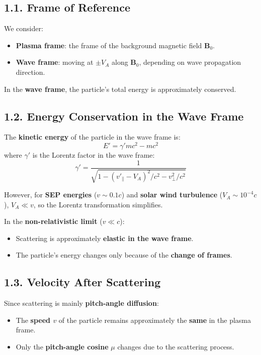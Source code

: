 \subsection*{1.1. \textbf{Frame of Reference}}

We consider:
\begin{itemize}
    \item \textbf{Plasma frame}: the frame of the background magnetic field $\mathbf{B}_0$.
    \item \textbf{Wave frame}: moving at $\pm V_A$ along $\mathbf{B}_0$, depending on wave propagation direction.
\end{itemize}

In the \textbf{wave frame}, the particle’s total energy is approximately conserved.

\subsection*{1.2. \textbf{Energy Conservation in the Wave Frame}}

The \textbf{kinetic energy} of the particle in the wave frame is:
\begin{equation}
E' = \gamma' m c^2 - m c^2
\end{equation}
where $\gamma'$ is the Lorentz factor in the wave frame:
\begin{equation}
\gamma' = \frac{1}{\sqrt{1 - (v'_{\parallel} - V_A)^2/c^2 - v_{\perp}^2/c^2}}
\end{equation}

However, for \textbf{SEP energies} ($v \sim 0.1c$) and \textbf{solar wind turbulence} ($V_A \sim 10^{-4}c$), $V_A \ll v$, so the Lorentz transformation simplifies.

In the \textbf{non-relativistic limit} ($v \ll c$):
\begin{itemize}
    \item Scattering is approximately \textbf{elastic in the wave frame}.
    \item The particle’s energy changes only because of the \textbf{change of frames}.
\end{itemize}

\subsection*{1.3. \textbf{Velocity After Scattering}}

Since scattering is mainly \textbf{pitch-angle diffusion}:
\begin{itemize}
    \item The \textbf{speed $v$} of the particle remains approximately the \textbf{same} in the plasma frame.
    \item Only the \textbf{pitch-angle cosine} $\mu$ changes due to the scattering process.
\end{itemize}


